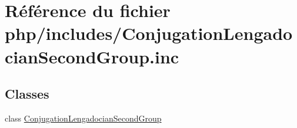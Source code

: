 \hypertarget{_conjugation_lengadocian_second_group_8inc}{}\section{Référence du fichier php/includes/\+Conjugation\+Lengadocian\+Second\+Group.inc}
\label{_conjugation_lengadocian_second_group_8inc}
\subsection*{Classes}
\begin{DoxyCompactItemize}
\item 
class \hyperlink{class_conjugation_lengadocian_second_group}{Conjugation\+Lengadocian\+Second\+Group}
\end{DoxyCompactItemize}
